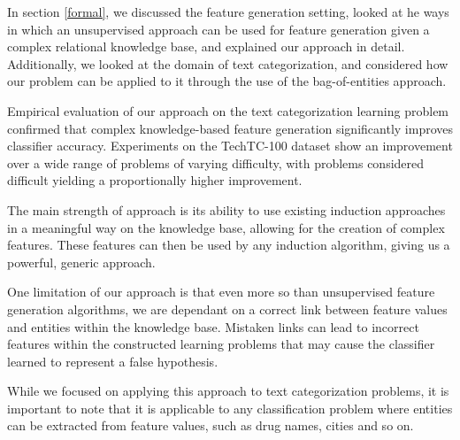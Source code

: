 \documentclass[twoside,11pt]{article}
\theoremstyle{definition}
\begin{document}
In section \ref{formal}, we discussed the feature generation setting, looked at he ways in which an unsupervised approach can be used for feature generation given a complex relational knowledge base, and explained our approach in detail.
Additionally, we looked at the domain of text categorization, and considered how our problem can be applied to it through the use of the bag-of-entities approach.

Empirical evaluation of our approach on the text categorization learning problem confirmed that complex knowledge-based feature generation significantly improves classifier accuracy. Experiments on the TechTC-100 dataset show an improvement over a wide range of problems of varying difficulty, with problems considered difficult yielding a proportionally higher improvement.

The main strength of approach is its ability to use existing induction approaches in a meaningful way on the knowledge base, allowing for the creation of complex features. These features can then be used by any induction algorithm, giving us a powerful, generic approach.

One limitation of our approach is that even more so than unsupervised feature generation algorithms,  we are dependant on a correct link between feature values and entities within the knowledge base. Mistaken links can lead to incorrect features within the constructed learning problems that may cause the classifier learned to represent a false hypothesis. 

While we focused on applying this approach to text categorization problems, it is important to note that it is applicable to any classification problem where entities can be extracted from feature values, such as drug names, cities and so on. 

\clearpage
\vskip 0.2in


\end{document}
